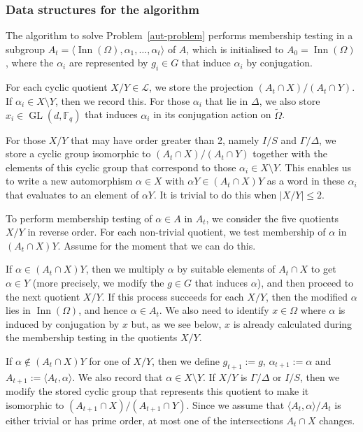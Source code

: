 \documentclass[12pt,twoside,reqno,psamsfonts]{amsproc}
\numberwithin{equation}{section}
\numberwithin{figure}{section}
\newcounter{algorithm}
\theoremstyle{plain}
\theoremstyle{definition}
\theoremstyle{remark}
\newcommand{\field}[1]{\mathbb{#1}}
\newcommand{\F}{\field{F}}
\DeclareMathOperator{\GL}{GL}
\DeclareMathOperator{\Inn}{Inn}
\begin{document}
\subsubsection{Data structures for the algorithm}
The algorithm to solve Problem~\ref{aut-problem} 
performs membership testing in
a subgroup $A_t = \langle \Inn(\Omega),\alpha_1,\ldots,\alpha_t \rangle$
of $A$, which is initialised to $A_0 = \Inn(\Omega)$, where the $\alpha_i$
are represented by $g_i \in G$ that induce $\alpha_i$ by conjugation.

For each cyclic quotient $X/Y \in \mathcal{L}$, we 
store the projection $(A_t \cap X)/(A_t \cap Y)$. 
If $\alpha_i \in X \setminus Y$, then we record this.
For those $\alpha_i$ that lie in $\Delta$, we also store 
$x_i \in \GL(d,\F_{q})$ that induces $\alpha_i$ in its conjugation action
on $\widetilde{\Omega}$.

For those $X/Y$ that may have order greater than 2, namely
$I/S$ and $\Gamma/\Delta$, we store a cyclic group isomorphic to
$(A_t \cap X)/(A_t \cap Y)$ together with the elements of this cyclic
group that correspond to those $\alpha_i \in X \setminus Y$.
This enables us to write a new automorphism $\alpha \in X$ with
$\alpha Y \in (A_t \cap X)Y$ as a word in these $\alpha_i$ that evaluates
to an element of $\alpha Y$.
It is trivial to do this when $|X/Y| \leqslant 2$.

To perform membership testing of $\alpha \in A$ in $A_t$,
we consider the five quotients $X/Y$ in reverse order.
For each non-trivial quotient,
we test membership of $\alpha$ in $(A_t \cap X)Y$.
Assume for the moment that we can do this.

If $\alpha \in (A_t \cap X)Y$,  then 
we multiply $\alpha$ by suitable elements of $A_t \cap X$ to get
$\alpha \in Y$ (more precisely, we modify the
$g\in G$ that induces $\alpha$),
and then proceed to the next quotient $X/Y$. If this process
succeeds for each $X/Y$, then the modified $\alpha$ lies in $\Inn(\Omega)$,
and hence $\alpha \in A_t$.
We also need to identify $x \in \Omega$ where $\alpha$ is 
induced by conjugation
by $x$ but, as we see below, $x$ is 
already calculated during the
membership testing in the quotients $X/Y$.

If $\alpha \not\in (A_t \cap X)Y$ for one of $X/Y$, 
then we define $g_{t+1}:=g$, $\alpha_{t+1}:=\alpha$ and
$A_{t+1} := \langle A_t,\alpha \rangle$. We also record that
$\alpha \in X \setminus Y$. If $X/Y$ is $\Gamma/\Delta$ or $I/S$, then we
modify the stored cyclic group that represents this quotient to
make it isomorphic to $(A_{t+1} \cap X)/(A_{t+1} \cap Y)$. Since we 
assume that $\langle A_t,\alpha \rangle/A_t$ is either trivial or has
prime order, at most one of the intersections $A_t \cap X$ changes.
\end{document}
